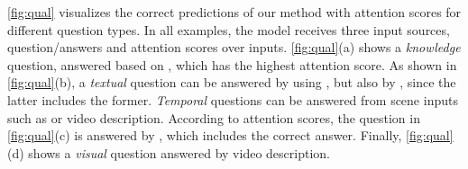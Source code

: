 \documentclass[10pt,twocolumn,letterpaper]{article}
\begin{document}
\autoref{fig:qual} visualizes the correct predictions of our method with \branch attention scores for different question types. In all examples, the model receives three input sources, question/answers and attention scores over inputs. \autoref{fig:qual}(a) shows a \emph{knowledge} question, answered based on \episodeSum, which has the highest attention score. As shown in \autoref{fig:qual}(b), a \emph{textual} question can be answered by using \sceneSum, but also by \episodeSum, since the latter includes the former. \emph{Temporal} questions can be answered from scene inputs such as \sceneSum or video description. According to attention scores, the question in \autoref{fig:qual}(c) is answered by \episodeSum, which includes the correct answer. Finally, \autoref{fig:qual}(d) shows a \emph{visual} question answered by video description.
\end{document}
